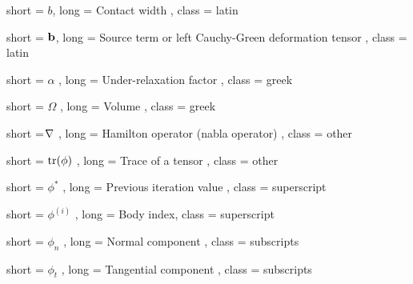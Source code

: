 

{
    short = \ensuremath{b},
    long  = \tabto{0.5cm} Contact width \hfill ,
    class = latin 
}


{
    short = \ensuremath{\ten{b}},
    long  = \tabto{0.5cm} Source term or left Cauchy-Green deformation tensor \hfill ,
    class = latin 
}

  


{
    short = $\alpha$ ,
    long  = \tabto{0.5cm} Under-relaxation factor \hfill,
    class = greek 
}

{
    short = $\Omega$ ,
    long  = \tabto{0.5cm} Volume \hfill ,%
    class = greek 
}



{
    short = $\hskip-3pt{\nabla}$ ,
    long  = \tabto{0.5cm} Hamilton operator (nabla operator) \hfill,
    class = other 
}


{
    short = \ensuremath{\textnormal{tr}(\phi)} ,
    long  = \tabto{0.5cm} Trace of a tensor \hfill,
    class = other 
}



{
    short = $\phi^*$ ,
    long  = \tabto{0.5cm} Previous iteration value \hfill,
    class = superscript 
}

{
    short = $\phi^{(i)}$ ,
    long  = \tabto{0.5cm} Body index\hfill,
    class = superscript 
}




{
    short = $\phi_n$ ,
    long  = \tabto{0.5cm} Normal component \hfill,
    class = subscripts
}

{
    short = $\phi_t$ ,
    long  = \tabto{0.5cm} Tangential component \hfill,
    class = subscripts
}

%
%
